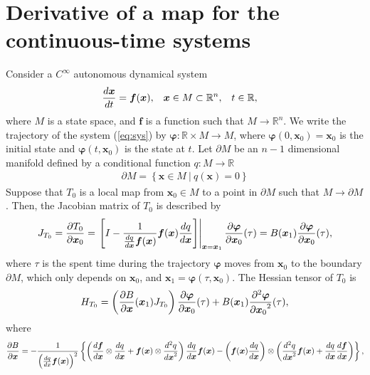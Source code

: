 \documentclass[a4paper]{article}
\newcommand{\R}{\mathbb{R}}
\newcommand{\deriv}[3][1]{%
    \ifthenelse{\equal{#1}{1}}{\frac{d #2}{d #3}}{\frac{d^#1 #2}{{d #3}^#1}}
}
\newcommand{\pderiv}[3][1]{%
    \ifthenelse{\equal{#1}{1}}{\frac{\partial #2}{\partial #3}}{\frac{\partial^#1 #2}{{\partial #3}^#1}}
}
\newcommand{\jac}{J}
\newcommand{\hes}{H}
\newcommand{\parens}[1]{\left(#1\right)}
\newcommand{\braces}[1]{\left\{#1\right\}}
\newcommand{\set}[1]{\braces{#1}}
\newcommand{\parm}{\partial\!M}
\newcommand{\brackets}[1]{\left[#1\right]}
\newcommand{\traj}{\bm \varphi}
\begin{document}
\section{Derivative of a map for the continuous-time systems}
Consider a $C^{\infty}$ autonomous dynamical system
\begin{align}
    \begin{aligned}
        \deriv{\bm x}{t} &= \bm f(\bm x), &
        \bm x &\in M \subset \R^n, &
        t &\in \R,
    \end{aligned}
    \label{eq:sys}
\end{align}
where $M$ is a state space, and $\bm f$ is a function such that $M \to \R^n$.
We write the trajectory of the system (\ref{eq:sys}) by $\traj: \R \times M \to M$,
where $\traj(0, \bm x_0) = \bm x_0$ is the initial state
and $\traj(t, \bm x_0)$ is the state at $t$.
Let $\parm$ be an $n-1$ dimensional manifold defined by
a conditional function $q: M \to \R$
\begin{align}
    \parm = \set{
        \bm x \in M ~|~
        q(\bm x) = 0
    }
\end{align}
Suppose that $T_0$ is a local map from $\bm x_0 \in M$ to a point in $\parm$
such that $M \to \parm$.
Then, the Jacobian matrix of $T_0$ is described by
\begin{align}
    \jac_{T_0} = \pderiv{T_0}{\bm x_0} =
    \left.
    \brackets{
        I -
        \frac{1}{\deriv{q}{\bm x} \bm f(\bm x)}
        \bm f(\bm x) \deriv{q}{\bm x}
    }
    \right|_{\bm x = \bm x_1}
    \pderiv{\traj}{\bm x_0}(\tau)
    =
    B(\bm x_1) \pderiv{\traj}{\bm x_0}(\tau),
\end{align}
where $\tau$ is the spent time during the trajectory $\traj$
moves from $\bm x_0$ to the boundary $\parm$, which only depends on $\bm x_0$,
and $\bm x_1 = \traj(\tau, \bm x_0)$.
The Hessian tensor of $T_0$ is
\begin{align}
    \hes_{T_0}
    =
    \parens{
        \pderiv{B}{\bm x} (\bm x_1) \jac_{T_0}
    }
    \pderiv{\traj}{\bm x_0}(\tau)
    +
    B(\bm x_1) \pderiv[2]{\traj}{\bm x_0}(\tau),
\end{align}
where
\begin{align}
    \pderiv{B}{\bm x}
    =
    - \frac{1}{
        \parens{\deriv{q}{x} \bm f(\bm x)}^2
    }
    \braces{
        \parens{
            \deriv{\bm f}{\bm x} \otimes \deriv{q}{\bm x}
            +
            \bm f(\bm x) \otimes \deriv[2]{q}{\bm x}
        }
        \deriv{q}{\bm x} \bm f(\bm x)
        -
        \parens{\bm f(\bm x) \deriv{q}{\bm x}} \otimes
        \parens{
            \deriv[2]{q}{\bm x} \bm f(\bm x)
            +
            \deriv{q}{\bm x} \deriv{\bm f}{\bm x}
        }
    },
\end{align}
\end{document}
